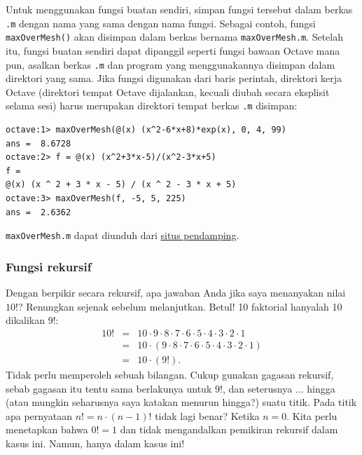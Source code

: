 Untuk menggunakan fungsi buatan sendiri, simpan fungsi tersebut dalam
berkas \texttt{.m}  dengan
nama yang sama dengan nama fungsi. Sebagai contoh, fungsi \texttt{maxOverMesh()}
akan disimpan dalam berkas bernama \texttt{maxOverMesh.m}. Setelah
itu, fungsi buatan sendiri dapat dipanggil seperti fungsi bawaan Octave
mana pun, asalkan berkas \texttt{.m} dan program yang menggunakannya
disimpan dalam direktori yang sama. Jika fungsi digunakan dari baris
perintah, direktori kerja Octave (direktori tempat Octave dijalankan,
kecuali diubah secara eksplisit selama sesi) harus merupakan direktori
tempat berkas \texttt{.m} disimpan:\begin{verbatim}
octave:1> maxOverMesh(@(x) (x^2-6*x+8)*exp(x), 0, 4, 99)
ans =  8.6728
octave:2> f = @(x) (x^2+3*x-5)/(x^2-3*x+5)
f =
@(x) (x ^ 2 + 3 * x - 5) / (x ^ 2 - 3 * x + 5)
octave:3> maxOverMesh(f, -5, 5, 225)
ans =  2.6362
\end{verbatim}\texttt{maxOverMesh.m} dapat diunduh dari \href{http://lqbrin.github.io/tea-time-numerical/ancillaries.html}{situs pendamping}.

\subsubsection{Fungsi rekursif}

Dengan berpikir secara rekursif, apa jawaban Anda jika saya menanyakan
nilai $10!$? Renungkan sejenak sebelum melanjutkan. Betul! 10 faktorial
hanyalah 10 dikalikan $9!$:
\begin{eqnarray*}
10! & = & 10\cdot9\cdot8\cdot7\cdot6\cdot5\cdot4\cdot3\cdot2\cdot1\\
 & = & 10\cdot(9\cdot8\cdot7\cdot6\cdot5\cdot4\cdot3\cdot2\cdot1)\\
 & = & 10\cdot(9!).
\end{eqnarray*}
Tidak perlu memperoleh sebuah bilangan. Cukup gunakan gagasan rekursif,
sebab gagasan itu tentu sama berlakunya untuk $9!$, dan seterusnya
$\ldots$ hingga (atau mungkin seharusnya saya katakan menurun hingga?)
suatu titik. Pada titik apa pernyataan $n!=n\cdot(n-1)!$ tidak lagi
benar? Ketika $n=0$. Kita perlu menetapkan bahwa $0!=1$ dan tidak
mengandalkan pemikiran rekursif dalam kasus ini. Namun, hanya dalam
kasus ini!

